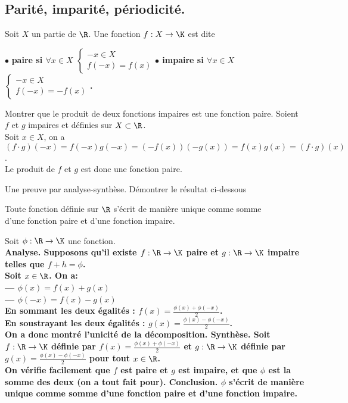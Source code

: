\documentclass[11pt]{article}
\begin{document}
\subsection{Parité, imparité, périodicité.}

\begin{defi}{}{}
    Soit $X$ un partie de $\R$. Une fonction $f:X\to\K$ est dite
    \begin{center}
        $\bullet$ \bf{paire} si $\forall x \in X$ $\begin{cases}-x\in X\\f(-x)=f(x)\end{cases}$\qquad$\bullet$ \bf{impaire} si $\forall x \in X$ $\begin{cases}-x\in X\\f(-x)=-f(x)\end{cases}$.
    \end{center}
\end{defi}

\begin{ex}{}{}
    Montrer que le produit de deux fonctions impaires est une fonction paire.
    \tcblower
    Soient $f$ et $g$ impaires et définies sur $X\subset\R$.\\
    Soit $x\in X$, on a $(f\cdot g)(-x)=f(-x)g(-x)=(-f(x))(-g(x))=f(x)g(x)=(f\cdot g)(x)$.\\
    Le produit de $f$ et $g$ est donc une fonction paire.
\end{ex}

\begin{ex}{Une preuve par analyse-synthèse.}{}
    Démontrer le résultat ci-dessous
    \begin{center}
        Toute fonction définie sur $\R$ s'écrit de manière unique comme somme\\
        d'une fonction paire et d'une fonction impaire.
    \end{center}
    \tcblower
    Soit $\phi:\R\to\K$ une fonction.\\
    \bf{Analyse.} Supposons qu'il existe $f:\R\to\K$ paire et $g:\R\to\K$ impaire telles que $f+h=\phi$.\\
    Soit $x\in\R$. On a:\\
    --- $\phi(x)=f(x)+g(x)$\\
    --- $\phi(-x)=f(x)-g(x)$\\
    En sommant les deux égalités : $f(x)=\frac{\phi(x)+\phi(-x)}{2}$.\\
    En soustrayant les deux égalités : $g(x)=\frac{\phi(x)-\phi(-x)}{2}$.\\
    On a donc montré l'unicité de la décomposition.\n
    \bf{Synthèse.} Soit $f:\R\to\K$ définie par $f(x)=\frac{\phi(x)+\phi(-x)}{2}$ et $g:\R\to\K$ définie par $g(x)=\frac{\phi(x)-\phi(-x)}{2}$ pour tout $x\in\R$.\\
    On vérifie facilement que $f$ est paire et $g$ est impaire, et que $\phi$ est la somme des deux (on a tout fait pour).\n
    \bf{Conclusion.} $\phi$ s'écrit de manière unique comme somme d'une fonction paire et d'une fonction impaire.
\end{ex}
\end{document}
